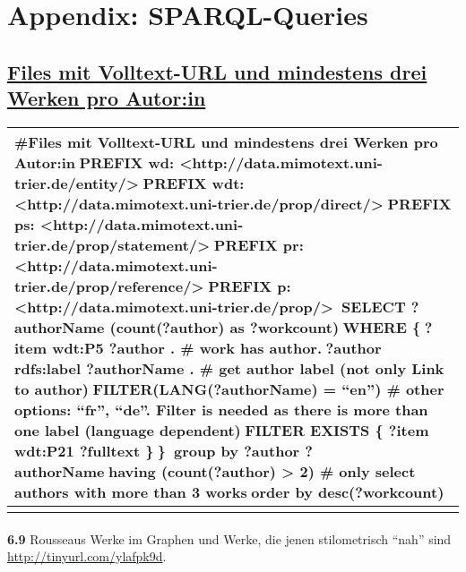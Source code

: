 \documentclass[
  letterpaper,
  DIV=11,
  numbers=noendperiod]{scrreprt}
\makeatletter
\let\oldparagraph\paragraph
\renewcommand{\paragraph}{
    \@ifstar
      \xxxParagraphStar
      \xxxParagraphNoStar
  }
\newcommand{\xxxParagraphStar}[1]{\oldparagraph*{#1}\mbox{}}
\newcommand{\xxxParagraphNoStar}[1]{\oldparagraph{#1}\mbox{}}
\makeatother
\begin{document}
\section{Appendix: SPARQL-Queries}\label{appendix-sparql-queries}

\subsection{\texorpdfstring{\href{https://tinyurl.com/232rx7wb}{Files
mit Volltext-URL und mindestens drei Werken pro
Autor:in}}{Files mit Volltext-URL und mindestens drei Werken pro Autor:in}}\label{files-mit-volltext-url-und-mindestens-drei-werken-pro-autorin}

\begin{longtable}[]{@{}
  >{\raggedright\arraybackslash}p{}@{}}
\toprule\noalign{}
\begin{minipage}[b]{\linewidth}\raggedright
\#Files mit Volltext-URL und mindestens drei Werken pro Autor:inPREFIX
wd:
\textless http://data.mimotext.uni-trier.de/entity/\textgreater{}PREFIX
wdt:
\textless http://data.mimotext.uni-trier.de/prop/direct/\textgreater{}PREFIX
ps:
\textless http://data.mimotext.uni-trier.de/prop/statement/\textgreater{}PREFIX
pr:
\textless http://data.mimotext.uni-trier.de/prop/reference/\textgreater{}PREFIX
p: \textless http://data.mimotext.uni-trier.de/prop/\textgreater{}SELECT
?authorName (count(?author) as ?workcount)WHERE \{?item wdt:P5 ?author .
\# work has author.?author rdfs:label ?authorName . \# get author label
(not only Link to author)FILTER(LANG(?authorName) = ``en'') \# other
options: ``fr'', ``de''. Filter is needed as there is more than one
label (language dependent)FILTER EXISTS \{ ?item wdt:P21 ?fulltext
\}\}group by ?author ?authorNamehaving (count(?author) \textgreater{} 2)
\# only select authors with more than 3 worksorder by desc(?workcount)
\end{minipage} \\
\midrule\noalign{}
\endhead
\bottomrule\noalign{}
\endlastfoot
\end{longtable}

\paragraph{}\label{section-2}

\textbf{6.9} Rousseaus Werke im Graphen und Werke, die jenen
stilometrisch ``nah'' sind \url{http://tinyurl.com/ylafpk9d}.
\end{document}
